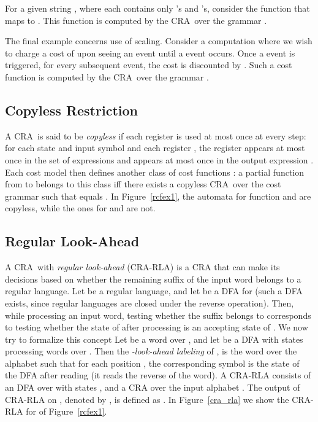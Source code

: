 \documentclass[11pt]{article}
\newcommand{\mypar}[1]{\subsection{#1}}
\newcommand{\EDWA}{{CRA}\xspace}
\newcommand{\REDWA}{{CRA}-{RLA}\xspace}
\begin{document}
For a given string , where each
 contains only 's and 's, consider the function  that
maps  to .  This function is computed by the
\EDWA\  over the grammar .

The final example concerns use of scaling. Consider a computation
where we wish to charge a cost of  upon seeing an  event until
a  event occurs.  Once a  event is triggered, for every
subsequent  event, the cost is discounted by . Such a cost
function is computed by the \EDWA\  over the grammar
.

\mypar{Copyless Restriction}
A \EDWA\  is said to be {\em copyless\/} if each register is
used at most once at every step: for each state  and input
symbol  and each register , the register  appears at
most once in the set of expressions  and  appears at most once in the output expression
.  Each cost model  then defines another class of cost functions
: a partial function  from  to
 belongs to this class iff there exists a copyless \EDWA\
 over the cost grammar  such that  equals
.  In Figure~\ref{rcfex1}, the
automata for function  and  are copyless, while the ones for
 and  are not.

\mypar{Regular Look-Ahead}\label{subsec:rla}
A \EDWA\  with {\em regular look-ahead} (\REDWA) is a
\EDWA\xspace that can make its decisions based on whether the
remaining suffix of the input word belongs to a regular language.  Let
 be a regular language, and let  be a DFA for  (such
a DFA exists, since regular languages are closed under the reverse
operation). Then, while processing an input word, testing whether the
suffix  belongs to  corresponds to testing whether
the state of  after processing  is an accepting
state of .  We now try to formalize this concept Let  be a word over , and let  be a DFA with states 
processing words over . Then the \emph{-look-ahead labeling} of
, is the word  over the alphabet  such
that for each position , the corresponding symbol is
the state of the DFA  after reading  (it reads the
reverse of the word).  A \REDWA consists of an DFA  over
 with states , and a \EDWA  over the input
alphabet .  The output of \REDWA  on , denoted by
, is defined as
.  In Figure~\ref{cra_rla} we
show the \REDWA for  of Figure~\ref{rcfex1}.
\end{document}
